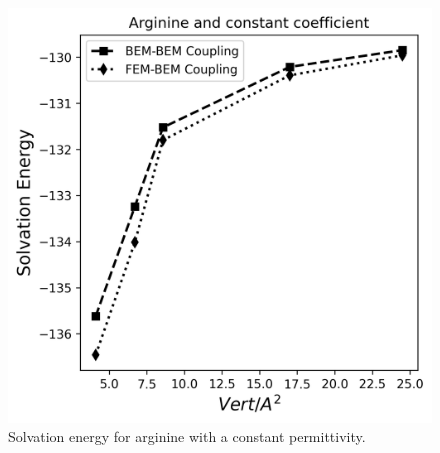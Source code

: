 \begin{figure}
\centering
   \includegraphics[width=0.47\linewidth]{DolfinX_Arginine2_const_coeff_error.png}
\caption{Solvation energy for arginine with a constant permittivity. %
}
\label{fig:arg_constant_energy}
\end{figure}

